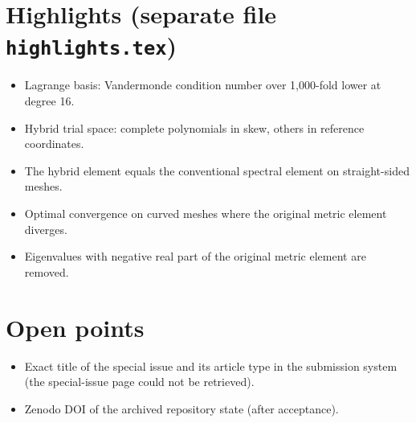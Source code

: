 \documentclass[10pt,a4paper]{article}
\begin{document}
\section{Highlights (separate file \texttt{highlights.tex})}

\begin{itemize}
  \item Lagrange basis: Vandermonde condition number over 1,000-fold lower at degree 16.
  \item Hybrid trial space: complete polynomials in skew, others in reference coordinates.
  \item The hybrid element equals the conventional spectral element on straight-sided meshes.
  \item Optimal convergence on curved meshes where the original metric element diverges.
  \item Eigenvalues with negative real part of the original metric element are removed.
\end{itemize}

\section{Open points}

\begin{itemize}
  \item Exact title of the special issue and its article type in the submission system (the special-issue page could not be retrieved).
  \item Zenodo DOI of the archived repository state (after acceptance).
\end{itemize}
\end{document}
